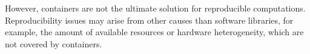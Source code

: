 
However, containers are not the ultimate solution for reproducible computations. Reproducibility issues may arise from other causes than software libraries, for example, the amount of available resources or hardware heterogeneity, which are not covered by containers.





